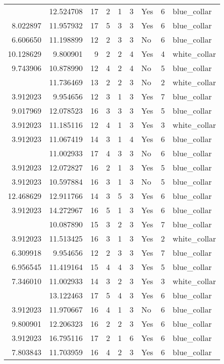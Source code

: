 \documentclass[
]{article}
\begin{document}
\begin{longtable}[t]{rrrrrllrl}
\addlinespace
3.912023 & 12.524708 & 17 & 2 & 1 & 3 & Yes & 6 & blue\_collar\\
8.022897 & 11.957932 & 17 & 5 & 3 & 3 & Yes & 6 & blue\_collar\\
6.606650 & 11.198899 & 12 & 2 & 3 & 3 & No & 6 & blue\_collar\\
10.128629 & 9.800901 & 9 & 2 & 2 & 4 & Yes & 4 & white\_collar\\
9.743906 & 10.878990 & 12 & 4 & 2 & 4 & No & 5 & blue\_collar\\
\addlinespace
10.128629 & 11.736469 & 13 & 2 & 2 & 3 & No & 2 & white\_collar\\
3.912023 & 9.954656 & 12 & 3 & 1 & 3 & Yes & 7 & blue\_collar\\
9.017969 & 12.078523 & 16 & 3 & 3 & 3 & Yes & 5 & blue\_collar\\
3.912023 & 11.185116 & 12 & 4 & 1 & 3 & Yes & 3 & white\_collar\\
3.912023 & 11.067419 & 14 & 3 & 1 & 4 & Yes & 6 & blue\_collar\\
\addlinespace
8.022897 & 11.002933 & 17 & 4 & 3 & 3 & No & 6 & blue\_collar\\
3.912023 & 12.072827 & 16 & 2 & 1 & 3 & Yes & 5 & blue\_collar\\
3.912023 & 10.597884 & 16 & 3 & 1 & 3 & No & 5 & blue\_collar\\
12.468629 & 12.911766 & 14 & 3 & 5 & 3 & Yes & 6 & blue\_collar\\
3.912023 & 14.272967 & 16 & 5 & 1 & 3 & Yes & 6 & blue\_collar\\
\addlinespace
8.486734 & 10.087890 & 15 & 3 & 2 & 3 & Yes & 7 & blue\_collar\\
3.912023 & 11.513425 & 16 & 3 & 1 & 3 & Yes & 2 & white\_collar\\
6.309918 & 9.954656 & 12 & 2 & 3 & 3 & Yes & 7 & blue\_collar\\
6.956545 & 11.419164 & 15 & 4 & 4 & 3 & Yes & 5 & blue\_collar\\
7.346010 & 11.002933 & 14 & 3 & 2 & 3 & Yes & 3 & white\_collar\\
\addlinespace
11.225910 & 13.122463 & 17 & 5 & 4 & 3 & Yes & 6 & blue\_collar\\
3.912023 & 11.970667 & 16 & 4 & 1 & 3 & No & 6 & blue\_collar\\
9.800901 & 12.206323 & 16 & 2 & 2 & 3 & Yes & 6 & blue\_collar\\
3.912023 & 16.795116 & 17 & 2 & 1 & 6 & Yes & 6 & blue\_collar\\
7.803843 & 11.703959 & 16 & 4 & 2 & 3 & Yes & 6 & blue\_collar\\

\end{longtable}
\end{document}
